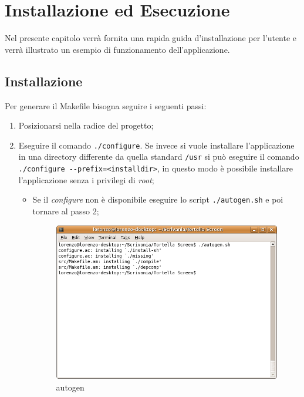 \chapter{Installazione ed Esecuzione}
\lstset{basicstyle=\normalsize}
Nel presente capitolo verrà fornita una rapida guida d'installazione per l'utente e verrà illustrato un esempio di funzionamento dell'applicazione.
\section{Installazione}
Per generare il Makefile bisogna seguire i seguenti passi: 
\begin{enumerate}
\item Posizionarsi nella radice del progetto; 
\item Eseguire il comando \texttt{./configure}. Se invece si vuole installare l'applicazione in una directory differente da quella standard \texttt{/usr} si può eseguire il comando 
\lstinline{./configure --prefix=<installdir>}, in questo modo è possibile installare l'applicazione senza i privilegi di \textit{root};
\begin{itemize}
\item Se il \textit{configure} non è disponibile eseguire lo script \texttt{./autogen.sh} e poi tornare al passo 2;
\begin{figure}[H]
\begin{center}
\includegraphics[scale=0.5]{etc/autogen.png}
\caption{autogen}
\label{autogen}
\end{center}
\end{figure}
\end{itemize}
\begin{figure}[H]

\end{figure}
\end{enumerate}

